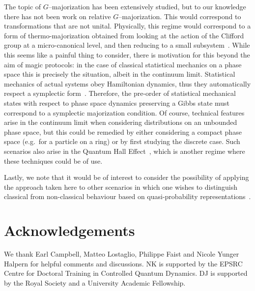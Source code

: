 \documentclass[pra,
aps,
twocolumn,
superscriptaddress,
groupedaddress,
nofootinbib,
reprint
]{revtex4-1}
\begin{document}
The topic of $G$--majorization has been extensively studied, but to our knowledge there has not been work on relative $G$--majorization. This would correspond to transformations that are not unital. Physically, this regime would correspond to a form of thermo-majorization obtained from looking at the action of the Clifford group at a micro-canonical level, and then reducing to a small subsystem~\cite{Pathria_1997}. While this seems like a painful thing to consider, there is motivation for this beyond the aim of magic protocols: in the case of classical statistical mechanics on a phase space this is precisely the situation, albeit in the continuum limit. Statistical mechanics of actual systems obey Hamiltonian dynamics, thus they automatically respect a symplectic form~\cite{Arnold_2000, Pathria_1997}. Therefore, the pre-order of statistical mechanical states with respect to phase space dynamics preserving a Gibbs state must correspond to a symplectic majorization condition. Of course, technical features arise in the continuum limit when considering distributions on an unbounded phase space, but this could be remedied by either considering a compact phase space (e.g.~for a particle on a ring) or by first studying the discrete case. Such scenarios also arise in the Quantum Hall Effect~\cite{Klitzing_1980}, which is another regime where these techniques could be of use.

Lastly, we note that it would be of interest to consider the possibility of applying the approach taken here to other scenarios in which one wishes to distinguish classical from non-classical behaviour based on quasi-probability representations~\cite{Ferrie_2008, barnett_1997,Allahverdyan_2018, arvidsson_2020, halpern_2018, Lostaglio_2018, Levy_2020}.

\section{Acknowledgements}
We thank Earl Campbell, Matteo Lostaglio, Philippe Faist and Nicole Yunger Halpern for helpful comments and discussions. NK is supported by the EPSRC Centre for Doctoral Training in Controlled Quantum Dynamics. DJ is supported by the Royal Society and a University Academic Fellowship.
	

%
%


\end{document}
